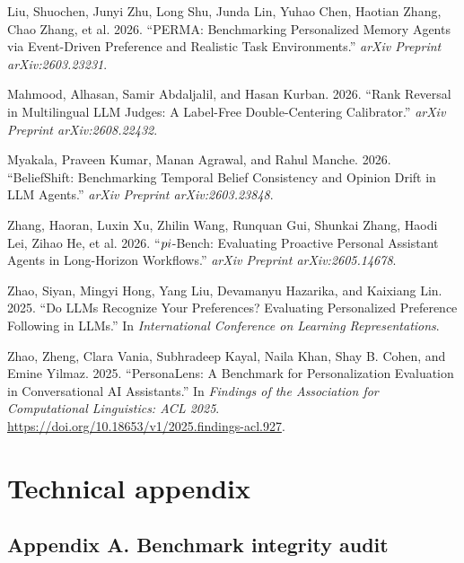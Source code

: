 \documentclass[
  10pt,
  letterpaper,
]{article}
\newlength{\cslhangindent}
\newenvironment{CSLReferences}[2] %
 {\begin{list}{}{%
  \setlength{\itemindent}{0pt}
  \setlength{\leftmargin}{0pt}
  \setlength{\parsep}{0pt}
  \ifodd #1
   \setlength{\leftmargin}{\cslhangindent}
   \setlength{\itemindent}{-1\cslhangindent}
  \fi
  \setlength{\itemsep}{#2\baselineskip}}}
 {\end{list}}
\begin{document}
\begin{CSLReferences}{1}{0}
Liu, Shuochen, Junyi Zhu, Long Shu, Junda Lin, Yuhao Chen, Haotian
Zhang, Chao Zhang, et al. 2026. {``PERMA: Benchmarking Personalized
Memory Agents via Event-Driven Preference and Realistic Task
Environments.''} \emph{arXiv Preprint arXiv:2603.23231}.

Mahmood, Alhasan, Samir Abdaljalil, and Hasan Kurban. 2026. {``Rank
Reversal in Multilingual LLM Judges: A Label-Free Double-Centering
Calibrator.''} \emph{arXiv Preprint arXiv:2608.22432}.

Myakala, Praveen Kumar, Manan Agrawal, and Rahul Manche. 2026.
{``BeliefShift: Benchmarking Temporal Belief Consistency and Opinion
Drift in LLM Agents.''} \emph{arXiv Preprint arXiv:2603.23848}.

Zhang, Haoran, Luxin Xu, Zhilin Wang, Runquan Gui, Shunkai Zhang, Haodi
Lei, Zihao He, et al. 2026. {``\(\\pi\)-Bench: Evaluating Proactive
Personal Assistant Agents in Long-Horizon Workflows.''} \emph{arXiv
Preprint arXiv:2605.14678}.

Zhao, Siyan, Mingyi Hong, Yang Liu, Devamanyu Hazarika, and Kaixiang
Lin. 2025. {``Do LLMs Recognize Your Preferences? Evaluating
Personalized Preference Following in LLMs.''} In \emph{International
Conference on Learning Representations}.

Zhao, Zheng, Clara Vania, Subhradeep Kayal, Naila Khan, Shay B. Cohen,
and Emine Yilmaz. 2025. {``PersonaLens: A Benchmark for Personalization
Evaluation in Conversational AI Assistants.''} In \emph{Findings of the
Association for Computational Linguistics: ACL 2025}.
\url{https://doi.org/10.18653/v1/2025.findings-acl.927}.

\end{CSLReferences}

\section{Technical appendix}\label{technical-appendix}

\subsection{Appendix A. Benchmark integrity
audit}\label{appendix-a.-benchmark-integrity-audit}
\end{document}
